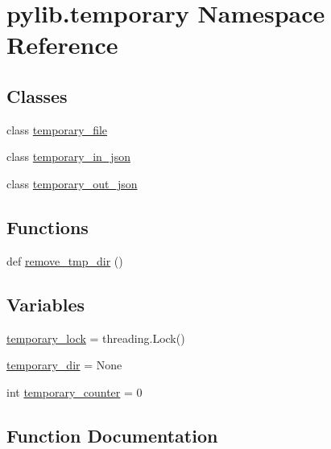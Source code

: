 \hypertarget{namespacepylib_1_1temporary}{}\section{pylib.\+temporary Namespace Reference}
\label{namespacepylib_1_1temporary}
\subsection*{Classes}
\begin{DoxyCompactItemize}
\item 
class \hyperlink{classpylib_1_1temporary_1_1temporary__file}{temporary\+\_\+file}
\item 
class \hyperlink{classpylib_1_1temporary_1_1temporary__in__json}{temporary\+\_\+in\+\_\+json}
\item 
class \hyperlink{classpylib_1_1temporary_1_1temporary__out__json}{temporary\+\_\+out\+\_\+json}
\end{DoxyCompactItemize}
\subsection*{Functions}
\begin{DoxyCompactItemize}
\item 
def \hyperlink{namespacepylib_1_1temporary_ac4fe4a0abb548b4ae5a33807ef991f9e}{remove\+\_\+tmp\+\_\+dir} ()
\end{DoxyCompactItemize}
\subsection*{Variables}
\begin{DoxyCompactItemize}
\item 
\hyperlink{namespacepylib_1_1temporary_a15a9fff6eb61ee31e4342a026f4bb4f0}{temporary\+\_\+lock} = threading.\+Lock()
\item 
\hyperlink{namespacepylib_1_1temporary_a579dec7300189c14eb7e58e7f73fcd54}{temporary\+\_\+dir} = None
\item 
int \hyperlink{namespacepylib_1_1temporary_ae18d2e487b08d3eb83f64d873f39a777}{temporary\+\_\+counter} = 0
\end{DoxyCompactItemize}


\subsection{Function Documentation}
